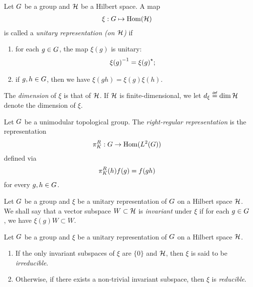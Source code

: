 \begin{definition}
\label{definition:unitary_representation}
    Let $G$ be a group and $\mathcal{H}$ be a Hilbert space.
    A map
    \begin{align*}
        \xi : G \mapsto \operatorname{Hom}(\mathcal{H})
    \end{align*}
    is called a \emph{unitary representation (on $\mathcal{H}$)} if
    \begin{enumerate}
        \item for each $g \in G$, the map $\xi(g)$ is unitary:
            \begin{align*}
                {\xi(g)}^{-1} = {\xi(g)}^\star;
            \end{align*}
        \item if $g, h \in G$, then we have $\xi(g h) = \xi(g) \xi(h)$.
    \end{enumerate}

    The \emph{dimension} of $\xi$ is that of $\mathcal{H}$.
    If $\mathcal{H}$ is finite-dimensional,
    we let $\dimRep{\xi} \defeq \dim{\Hil}$ denote the dimension of $\xi$.
\end{definition}

\begin{example}
    Let $G$ be a unimodular topological group.
    The \emph{right-regular representation} is the representation
    \begin{align*}
        \pi^R_{K} : G \to \operatorname{Hom}({L^{2} (G)})
    \end{align*}
    defined via
    \begin{align*}
        \pi^R_{K}(h) f(g) = f(g h)
    \end{align*}
    for every $g, h \in G$.
\end{example}

\begin{definition}
\label{definition:invariant_subspaces}
    Let $G$ be a group and $\xi$ be a unitary representation of $G$ on a Hilbert space $\mathcal{H}$.
    We shall say that a vector subspace $W \subset \mathcal{H}$ is \emph{invariant} under $\xi$
    if for each $g \in G$, we have $\xi(g) W \subset W$.
\end{definition}

\begin{definition}[Irreducibility]
\label{definition:irreducible_representations}
    Let $G$ be a group and $\xi$ be a unitary representation of $G$ on a Hilbert space $\mathcal{H}$.
    \begin{enumerate}
        \item If the only invariant subspaces of $\xi$ are $\{0\}$ and $\mathcal{H}$,
            then $\xi$ is said to be \emph{irreducible}.
        \item Otherwise, if there exists a non-trivial invariant subspace,
            then $\xi$ is \emph{reducible}.
    \end{enumerate}
\end{definition}

